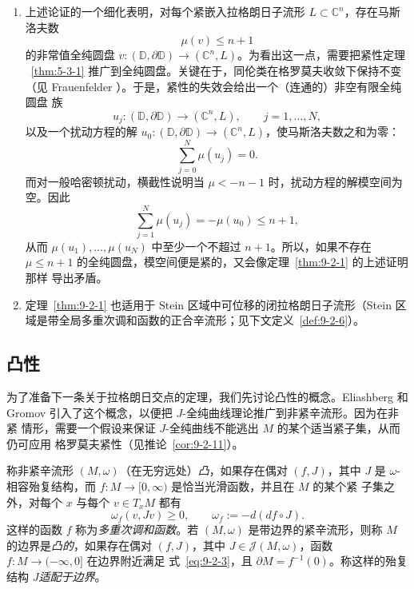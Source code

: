 \begin{remark}\label{rem:9-2-5}
\begin{enumerate}[label=\textup{(\roman*)}]
\item 上述论证的一个细化表明，对每个紧嵌入拉格朗日子流形
$L\subset\mathbb C^n$，存在马斯洛夫数
\[
  \mu(v)\le n+1
\]
的非常值全纯圆盘
$v:(\mathbb D,\partial\mathbb D)\to(\mathbb C^n,L)$。为看出这一点，需要把紧性定理
~\ref{thm:5-3-1} 推广到全纯圆盘。关键在于，同伦类在格罗莫夫收敛下保持不变（见
Frauenfelder ）。于是，紧性的失效会给出一个（连通的）非空有限全纯圆盘
族
\[
  u_j:(\mathbb D,\partial\mathbb D)\longrightarrow(\mathbb C^n,L),
  \qquad j=1,\ldots,N,
\]
以及一个扰动方程的解
$u_0:(\mathbb D,\partial\mathbb D)\to(\mathbb C^n,L)$，使马斯洛夫数之和为零：
\[
  \sum_{j=0}^N\mu(u_j)=0.
\]
而对一般哈密顿扰动，横截性说明当 $\mu<-n-1$ 时，扰动方程的解模空间为空。因此
\[
  \sum_{j=1}^N\mu(u_j)=-\mu(u_0)\le n+1,
\]
从而 $\mu(u_1),\ldots,\mu(u_N)$ 中至少一个不超过 $n+1$。所以，如果不存在
$\mu\le n+1$ 的全纯圆盘，模空间便是紧的，又会像定理~\ref{thm:9-2-1} 的上述证明那样
导出矛盾。

\item 定理~\ref{thm:9-2-1} 也适用于 Stein 区域中可位移的闭拉格朗日子流形（Stein
区域是带全局多重次调和函数的正合辛流形；见下文定义~\ref{def:9-2-6}）。
\end{enumerate}
\end{remark}
\subsection*{凸性}

为了准备下一条关于拉格朗日交点的定理，我们先讨论凸性的概念。Eliashberg 和 Gromov
 引入了这个概念，以便把 $J$-全纯曲线理论推广到非紧辛流形。因为在非紧
情形，需要一个假设来保证 $J$-全纯曲线不能逃出 $M$ 的某个适当紧子集，从而仍可应用
格罗莫夫紧性（见推论~\ref{cor:9-2-11}）。

\begin{definition}\label{def:9-2-6}
称非紧辛流形 $(M,\omega)$（在无穷远处）\emph{凸}，如果存在偶对 $(f,J)$，其中 $J$ 是
$\omega$-相容殆复结构，而 $f:M\to[0,\infty)$ 是恰当光滑函数，并且在 $M$ 的某个紧
子集之外，对每个 $x$ 与每个 $v\in T_xM$ 都有
\begin{equation}\label{eq:9-2-3}
  \omega_f(v,Jv)\ge0,
  \qquad \omega_f:=-d(df\circ J).
\end{equation}
这样的函数 $f$ 称为\emph{多重次调和函数}。若 $(M,\omega)$ 是带边界的紧辛流形，则称
$M$ 的边界是\emph{凸的}，如果存在偶对 $(f,J)$，其中
$J\in\mathcal J(M,\omega)$，函数 $f:M\to(-\infty,0]$ 在边界附近满足
式~\eqref{eq:9-2-3}，且 $\partial M=f^{-1}(0)$。称这样的殆复结构 $J$\emph{适配于边界}。
\end{definition}

